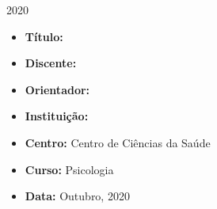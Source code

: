 \documentclass[chapter=TITLE,
               oneside,
               12pt,
               a4paper,
               english,
               brazil]{abntex2}    %
\renewcommand{\ABNTEXchapterfont}{\normalfont\fontseries{b}\selectfont}
\renewcommand{\imprimircapa}{%
    \begin{capa}%
        \center
        \ABNTEXchapterfont\Large\MakeUppercase\imprimirinstituicao

        \vspace*{1cm}

        {\ABNTEXchapterfont\Large\MakeUppercase\imprimirautor}

        \vfill
        \begin{center}
            \ABNTEXchapterfont\bfseries\LARGE\MakeUppercase\imprimirtitulo
        \end{center}
        \vfill

        \large\imprimirlocal

        \large{2020}

        \vspace*{1cm}
    \end{capa}
}
\begin{document}
\imprimircapa

\imprimirfolhaderosto

\label{sec:identificacao}

    \begin{itemize}

        \item \textbf{Título:} \imprimirtitulo

        \item \textbf{Discente:} \imprimirautor

        \item \textbf{Orientador:} \imprimirorientadorRotulo~\imprimirorientador

        \item \textbf{Instituição:} \imprimirinstituicao
            
        \item \textbf{Centro:} Centro de Ciências da Saúde

        \item \textbf{Curso:} Psicologia

        \item \textbf{Data:} Outubro, 2020

    \end{itemize}

\newpage
\begin{KeepFromToc}
\tableofcontents
\end{KeepFromToc}
\newpage
\end{document}
